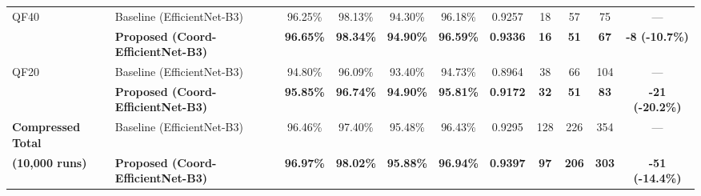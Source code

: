 \documentclass[conference]{IEEEtran}
\begin{document}
\begin{table}[t]
\begin{tabular}{llccccccccc}
\midrule
QF40  & Baseline (EfficientNet-B3) & 96.25\% & 98.13\% & 94.30\% & 96.18\% & 0.9257 & 18 & 57 & 75 & --- \\
      & \textbf{Proposed (Coord-EfficientNet-B3)} & \textbf{96.65\%} & \textbf{98.34\%} & \textbf{94.90\%} & \textbf{96.59\%} & \textbf{0.9336} & \textbf{16} & \textbf{51} & \textbf{67} & \textbf{-8 (-10.7\%)} \\
\midrule
QF20  & Baseline (EfficientNet-B3) & 94.80\% & 96.09\% & 93.40\% & 94.73\% & 0.8964 & 38 & 66 & 104 & --- \\
      & \textbf{Proposed (Coord-EfficientNet-B3)} & \textbf{95.85\%} & \textbf{96.74\%} & \textbf{94.90\%} & \textbf{95.81\%} & \textbf{0.9172} & \textbf{32} & \textbf{51} & \textbf{83} & \textbf{-21 (-20.2\%)} \\
\midrule
\textbf{Compressed Total} & Baseline (EfficientNet-B3) & 96.46\% & 97.40\% & 95.48\% & 96.43\% & 0.9295 & 128 & 226 & 354 & --- \\
\textbf{(10,000 runs)}     & \textbf{Proposed (Coord-EfficientNet-B3)} & \textbf{96.97\%} & \textbf{98.02\%} & \textbf{95.88\%} & \textbf{96.94\%} & \textbf{0.9397} & \textbf{97} & \textbf{206} & \textbf{303} & \textbf{-51 (-14.4\%)} \\
\bottomrule
\end{tabular}
\end{table}
\end{document}
